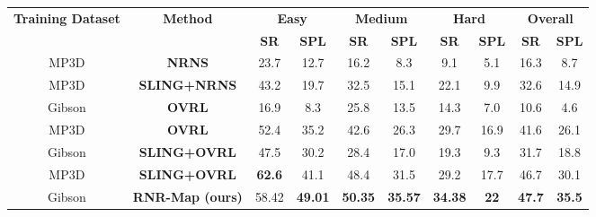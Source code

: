 \begin{tabular}{@{}cccccccccc@{}}
\toprule
\multirow{2}{*}{\textbf{Training Dataset}} & \multirow{2}{*}{\textbf{Method}} & \multicolumn{2}{c}{\textbf{Easy}} & \multicolumn{2}{c}{\textbf{Medium}} & \multicolumn{2}{c}{\textbf{Hard}} & \multicolumn{2}{c}{\textbf{Overall}} \\ \cmidrule(l){3-10} 
 &  & \textbf{SR} & \textbf{SPL} & \textbf{SR} & \textbf{SPL} & \textbf{SR} & \textbf{SPL} & \textbf{SR} & \textbf{SPL} \\ \midrule
MP3D & \textbf{NRNS \cite{NRNS}} & 23.7 & 12.7 & 16.2 & 8.3 & 9.1 & 5.1 & 16.3 & 8.7 \\
MP3D & \textbf{SLING+NRNS \cite{SLING}} & 43.2 & 19.7 & 32.5 & 15.1 & 22.1 & 9.9 & 32.6 & 14.9 \\
Gibson & \textbf{OVRL \cite{OVRL}} & 16.9 & 8.3 & 25.8 & 13.5 & 14.3 & 7.0 & 10.6 & 4.6 \\
MP3D & \textbf{OVRL \cite{OVRL}} & 52.4 & 35.2 & 42.6 & 26.3 & 29.7 & 16.9 & 41.6 & 26.1 \\
Gibson & \textbf{SLING+OVRL \cite{SLING}} & 47.5 & 30.2 & 28.4 & 17.0 & 19.3 & 9.3 & 31.7 & 18.8 \\
MP3D & \textbf{SLING+OVRL \cite{SLING}} & \textbf{62.6} & 41.1 & 48.4 & 31.5 & 29.2 & 17.7 & 46.7 & 30.1 \\ \midrule
Gibson & \textbf{RNR-Map (ours) } & 58.42 & \textbf{49.01} & \textbf{50.35} & \textbf{35.57} & \textbf{34.38} & \textbf{22} & \textbf{47.7} & \textbf{35.5} \\ \bottomrule
\end{tabular}